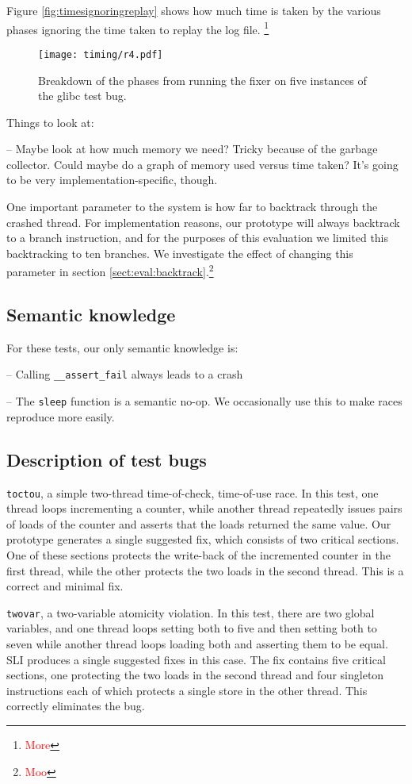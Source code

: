 \documentclass[10pt,twocolumn,preprint,natbib,authoryear]{sigplanconf}
\newcommand{\editorial}[1]{\textcolor{red}{\footnote{\textcolor{red}{#1}}}}
\begin{document}
Figure \ref{fig:timesignoringreplay} shows how much time is taken by
the various phases ignoring the time taken to replay the log file.
\editorial{More}

\begin{figure*}
\texttt{[image: timing/r4.pdf]}
\caption{Breakdown of the phases from running the fixer on five instances
  of the glibc test bug.}
\label{fig:r4}
\end{figure*}

Things to look at:

-- Maybe look at how much memory we need?  Tricky because of the
garbage collector.  Could maybe do a graph of memory used versus time
taken?  It's going to be very implementation-specific, though.

One important parameter to the system is how far to backtrack through
the crashed thread.  For implementation reasons, our prototype will
always backtrack to a branch instruction, and for the purposes of this
evaluation we limited this backtracking to ten branches.  We
investigate the effect of changing this parameter in section
\ref{sect:eval:backtrack}.\editorial{Moo}

\subsection{Semantic knowledge}

For these tests, our only semantic knowledge is:

-- Calling \verb|__assert_fail| always leads to a crash

-- The \verb|sleep| function is a semantic no-op.  We occasionally use
this to make races reproduce more easily.

\subsection{Description of test bugs}

\verb|toctou|, a simple two-thread time-of-check, time-of-use race.
In this test, one thread loops incrementing a counter, while another
thread repeatedly issues pairs of loads of the counter and asserts
that the loads returned the same value.  Our prototype generates a
single suggested fix, which consists of two critical sections.  One of
these sections protects the write-back of the incremented counter in
the first thread, while the other protects the two loads in the second
thread.  This is a correct and minimal fix.

\verb|twovar|, a two-variable atomicity violation.  In this test,
there are two global variables, and one thread loops setting both to
five and then setting both to seven while another thread loops loading
both and asserting them to be equal.  SLI produces a single suggested
fixes in this case.  The fix contains five critical sections, one
protecting the two loads in the second thread and four singleton
instructions each of which protects a single store in the other
thread.  This correctly eliminates the bug.
\end{document}
